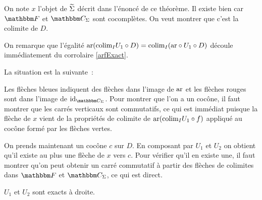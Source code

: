 \begin{pv}
    On note $x$ l'objet de $\widetilde{\Sigma}$ décrit dans l'énoncé de ce théorème. Il existe
    bien car $\cf$ et $\C_\Sigma$ sont cocomplètes. On veut
    montrer que c'est la colimite de $D$.

    On remarque que l'égalité $\text{ar}(\text{colim}_I U_1\circ D) = \text{colim}_I (\text{ar}\circ U_1\circ D)$
    découle immédiatement du corrolaire \ref{arfExact}.

    La situation est la suivante~:

    \begin{center}\end{center}

    Les flèches bleues indiquent des flèches dans l'image de $\text{ar}$ et les flèches
    rouges sont dans l'image de $\id_{\C_\Sigma}$. Pour montrer que l'on a un cocône,
    il faut montrer que les carrés verticaux sont commutatifs, ce qui est immédiat
    puisque la flèche de $x$ vient de la propriétés de colimite de
    $\text{ar}(\text{colim}_I U_1\circ f)$ appliqué au cocône formé par les flèches vertes.

    On prends maintenant un cocône $c$ sur $D$. En composant par $U_1$ et $U_2$ on obtient
    qu'il existe au plus une flèche de $x$ vers $c$. Pour vérifier qu'il en existe une,
    il faut montrer qu'on peut obtenir un carré commutatif à partir des flèches de
    colimites dans $\cf$ et $\C_\Sigma$, ce qui est direct.
\end{pv}

\begin{cor}
    $U_1$ et $U_2$ sont exacts à droite.
\end{cor}


